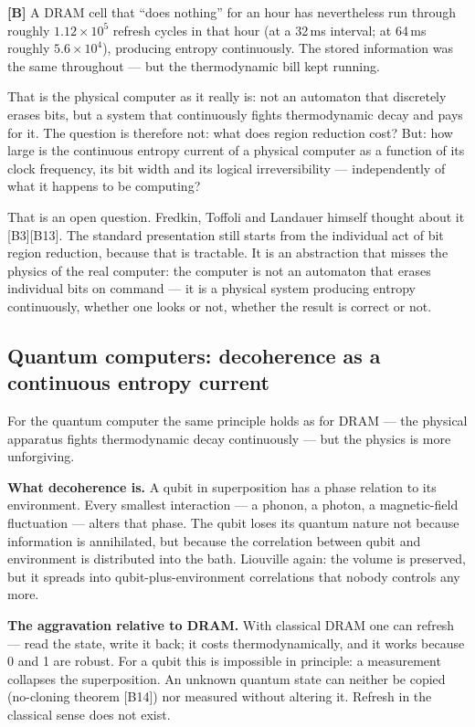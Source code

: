 \textbf{[B]} A DRAM cell that “does nothing” for an hour has nevertheless run through
roughly $1.12\times10^{5}$ refresh cycles in that hour (at a 32\,ms interval; at
64\,ms roughly $5.6\times10^{4}$), producing entropy continuously. The stored
information was the same throughout --- but the thermodynamic bill kept running.

That is the physical computer as it really is: not an automaton that discretely
erases bits, but a system that continuously fights thermodynamic decay and pays
for it. The question is therefore not: what does region reduction cost? But: how
large is the continuous entropy current of a physical computer as a function of
its clock frequency, its bit width and its logical irreversibility ---
independently of what it happens to be computing?

That is an open question. Fredkin, Toffoli and Landauer himself thought about it
[B3][B13]. The standard presentation still starts from the individual act of bit
region reduction, because that is tractable. It is an abstraction that misses the
physics of the real computer: the computer is not an automaton that erases
individual bits on command --- it is a physical system producing entropy
continuously, whether one looks or not, whether the result is correct or not.

\subsection{Quantum computers: decoherence as a continuous entropy current}

For the quantum computer the same principle holds as for DRAM --- the physical
apparatus fights thermodynamic decay continuously --- but the physics is more
unforgiving.

\textbf{What decoherence is.} A qubit in superposition has a phase relation to its
environment. Every smallest interaction --- a phonon, a photon, a magnetic-field
fluctuation --- alters that phase. The qubit loses its quantum nature not because
information is annihilated, but because the correlation between qubit and
environment is distributed into the bath. Liouville again: the volume is
preserved, but it spreads into qubit-plus-environment correlations that nobody
controls any more.

\textbf{The aggravation relative to DRAM.} With classical DRAM one can refresh ---
read the state, write it back; it costs thermodynamically, and it works because 0
and 1 are robust. For a qubit this is impossible in principle: a measurement
collapses the superposition. An unknown quantum state can neither be copied
(no-cloning theorem [B14]) nor measured without altering it. Refresh in the
classical sense does not exist.

